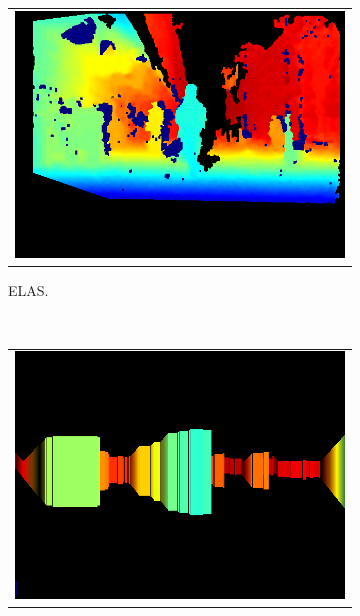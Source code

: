 \begin{figure}[h!]
        \centering
        \begin{subfigure}[b]{0.25\textwidth}
	  \begin{tabular}{c}
	    \includegraphics[width=\textwidth]{elas}\label{fig:cp04_reconstruction_elas}
	  \end{tabular}
	  \caption{ELAS.}
        \end{subfigure}%
        ~
        \begin{subfigure}[b]{0.25\textwidth}
	  \begin{tabular}{c}
	    \includegraphics[width=\textwidth]{stixels}\label{fig:cp04_reconstruction_stixels}
	  \end{tabular}

\end{subfigure}
\end{figure}
